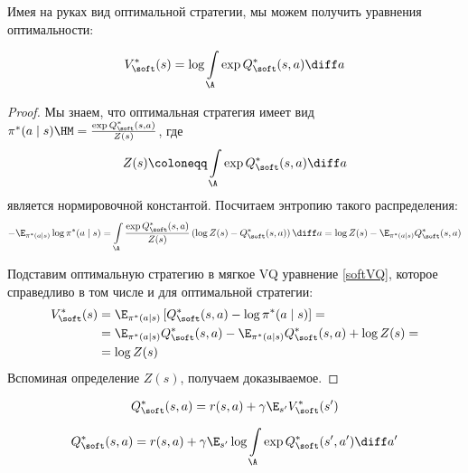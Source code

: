 

Имея на руках вид оптимальной стратегии, мы можем получить уравнения оптимальности:

\begin{theorem}
\begin{equation}\label{softV*Q*}
V^*_{\soft}(s) = \log \int\limits_{\A} \exp Q^*_{\soft}(s, a) \diff a
\end{equation}
\begin{proof}
Мы знаем, что оптимальная стратегия имеет вид $\pi^*(a \mid s) \HM= \frac{\exp{Q^*_{\soft}(s, a)}}{Z(s)}$, где
$$Z(s) \coloneqq \int\limits_{\A} \exp Q^*_{\soft}(s, a) \diff a$$
является нормировочной константой. Посчитаем энтропию такого распределения:
$$-\E_{\pi^*(a \mid s)} \log \pi^*(a \mid s) = \int\limits_{\A} \frac{\exp{Q^*_{\soft}(s, a)}}{Z(s)} \left(\log Z(s) - Q^*_{\soft}(s, a) \right) \diff a = \log Z(s) - \E_{\pi^*(a \mid s)} Q^*_{\soft}(s, a)$$

Подставим оптимальную стратегию в мягкое VQ уравнение \eqref{softVQ}, которое справедливо в том числе и для оптимальной стратегии:
\begin{align*}
V^*_{\soft}(s) &= \E_{\pi^*(a \mid s)} \left[ Q^*_{\soft}(s, a) - \log \pi^*(a \mid s) \right] = \\ &= \E_{\pi^*(a \mid s)} Q^*_{\soft}(s, a) - \E_{\pi^*(a \mid s)} Q^*_{\soft}(s, a) + \log Z(s) = \\ &= \log Z(s)
\end{align*}
Вспоминая определение $Z(s)$, получаем доказываемое.
\end{proof}
\end{theorem}

\begin{proposition}
$$Q^*_{\soft}(s, a) = r(s, a) + \gamma \E_{s'} V^*_{\soft}(s')$$
\end{proposition}

\begin{proposition}
\begin{equation}\label{softQ*Q*}
Q^*_{\soft}(s, a) = r(s, a) + \gamma \E_{s'} \log \int\limits_{\A} \exp Q^*_{\soft}(s', a') \diff a'
\end{equation}
\end{proposition}

